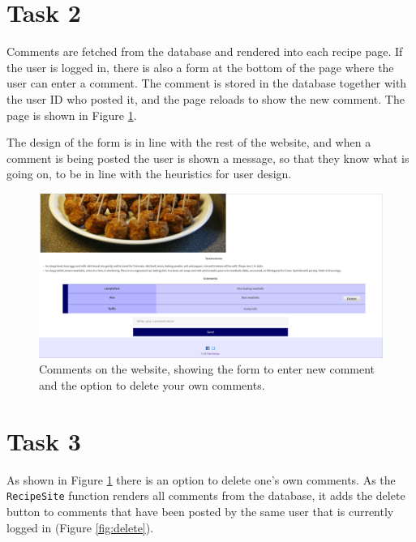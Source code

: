 \documentclass[a4paper]{scrreprt}
\newcommand{\code}[1]{\texttt{#1}}
\begin{document}
\section{Task 2}

Comments are fetched from the database and rendered into each recipe page. If the user is logged in, there is also a form at the bottom of the page where the user can enter a comment. The comment is stored in the database together with the user ID who posted it, and the page reloads to show the new comment. The page is shown in Figure \ref{fig:comments}.

The design of the form is in line with the rest of the website, and when a comment is being posted the user is shown a message, so that they know what is going on, to be in line with the heuristics for user design.

\begin{figure}[h!]
  \begin{center}
    \includegraphics[scale=0.24]{img/comments.png}
    \caption{Comments on the website, showing the form to enter new comment and the option to delete your own comments.}
    \label{fig:comments}
  \end{center}
\end{figure}

\section{Task 3}

As shown in Figure \ref{fig:comments} there is an option to delete one's own comments. As the \code{RecipeSite} function renders all comments from the database, it adds the delete button to comments that have been posted by the same user that is currently logged in (Figure \ref{fig:delete}).
\end{document}
